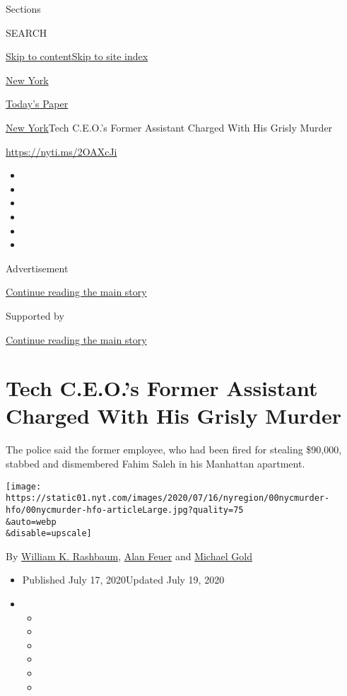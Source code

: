 Sections

SEARCH

\protect\hyperlink{site-content}{Skip to
content}\protect\hyperlink{site-index}{Skip to site index}

\href{https://www.nytimes.com/section/nyregion}{New York}

\href{https://myaccount.nytimes.com/auth/login?response_type=cookie\&client_id=vi}{}

\href{https://www.nytimes.com/section/todayspaper}{Today's Paper}

\href{/section/nyregion}{New York}\textbar{}Tech C.E.O.'s Former
Assistant Charged With His Grisly Murder

\url{https://nyti.ms/2OAXcJi}

\begin{itemize}
\item
\item
\item
\item
\item
\item
\end{itemize}

Advertisement

\protect\hyperlink{after-top}{Continue reading the main story}

Supported by

\protect\hyperlink{after-sponsor}{Continue reading the main story}

\hypertarget{tech-ceos-former-assistant-charged-with-his-grisly-murder}{%
\section{Tech C.E.O.'s Former Assistant Charged With His Grisly
Murder}\label{tech-ceos-former-assistant-charged-with-his-grisly-murder}}

The police said the former employee, who had been fired for stealing
\$90,000, stabbed and dismembered Fahim Saleh in his Manhattan
apartment.

\texttt{[image: https://static01.nyt.com/images/2020/07/16/nyregion/00nycmurder-hfo/00nycmurder-hfo-articleLarge.jpg?quality=75\\\&auto=webp\\\&disable=upscale]}

By \href{https://www.nytimes.com/by/william-k-rashbaum}{William K.
Rashbaum}, \href{https://www.nytimes.com/by/alan-feuer}{Alan Feuer} and
\href{https://www.nytimes.com/by/michael-gold}{Michael Gold}

\begin{itemize}
\item
  Published July 17, 2020Updated July 19, 2020
\item
  \begin{itemize}
  \item
  \item
  \item
  \item
  \item
  \item
  \end{itemize}
\end{itemize}

